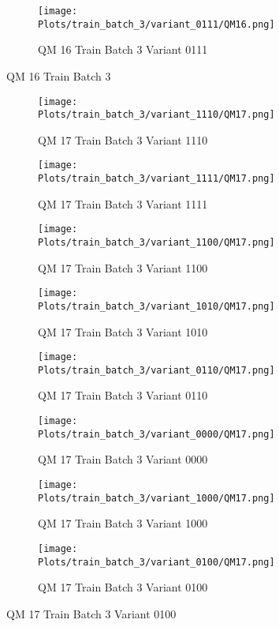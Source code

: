 \documentclass{DissertateFigs}
\begin{document}
\begin{figure}[t!]
\medskip

    \begin{subfigure}{0.33\textwidth}
    \texttt{[image: Plots/train\_batch\_3/variant\_0111/QM16.png]}
    \caption{QM 16 Train Batch 3 Variant 0111}
    \end{subfigure}
\caption{QM 16 Train Batch 3}
    \end{figure}
\clearpage
\begin{figure}[t!]
    \begin{subfigure}{0.43\textwidth}
    \texttt{[image: Plots/train\_batch\_3/variant\_1110/QM17.png]}
    \caption{QM 17 Train Batch 3 Variant 1110}
    \end{subfigure}
    \begin{subfigure}{0.43\textwidth}
    \texttt{[image: Plots/train\_batch\_3/variant\_1111/QM17.png]}
    \caption{QM 17 Train Batch 3 Variant 1111}
    \end{subfigure}

\medskip

    \begin{subfigure}{0.43\textwidth}
    \texttt{[image: Plots/train\_batch\_3/variant\_1100/QM17.png]}
    \caption{QM 17 Train Batch 3 Variant 1100}
    \end{subfigure}
    \begin{subfigure}{0.43\textwidth}
    \texttt{[image: Plots/train\_batch\_3/variant\_1010/QM17.png]}
    \caption{QM 17 Train Batch 3 Variant 1010}
    \end{subfigure}

\medskip

    \begin{subfigure}{0.43\textwidth}
    \texttt{[image: Plots/train\_batch\_3/variant\_0110/QM17.png]}
    \caption{QM 17 Train Batch 3 Variant 0110}
    \end{subfigure}
    \begin{subfigure}{0.43\textwidth}
    \texttt{[image: Plots/train\_batch\_3/variant\_0000/QM17.png]}
    \caption{QM 17 Train Batch 3 Variant 0000}
    \end{subfigure}

\medskip

    \begin{subfigure}{0.43\textwidth}
    \texttt{[image: Plots/train\_batch\_3/variant\_1000/QM17.png]}
    \caption{QM 17 Train Batch 3 Variant 1000}
    \end{subfigure}
    \begin{subfigure}{0.43\textwidth}
    \texttt{[image: Plots/train\_batch\_3/variant\_0100/QM17.png]}
    \caption{QM 17 Train Batch 3 Variant 0100}
    \end{subfigure}


\end{figure}
\end{document}
